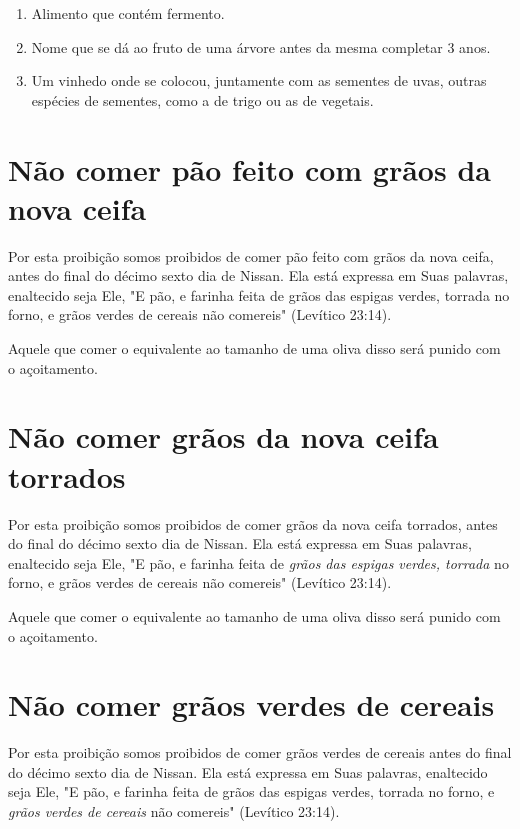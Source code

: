 \begin{enumerate}
\def\labelenumi{\arabic{enumi}.}
\setcounter{enumi}{357}
\item
 
 Alimento que contém fermento.
 
\item
 
 Nome que se dá ao fruto de uma árvore antes da mesma completar 3 anos.
 
\item
 
 Um vinhedo onde se colocou, juntamente com as sementes de uvas, outras
 espécies de se­mentes, como a de trigo ou as de vegetais.
 
\end{enumerate}

\section{Não comer pão feito com grãos da nova ceifa}

Por esta proibição somos proibidos de comer pão feito com grãos da nova
ceifa, antes do final do décimo sexto dia de Nissan. Ela está expressa
em Suas palavras, enaltecido seja Ele, "E pão, e farinha feita de grãos
das espigas verdes, torrada no forno, e grãos verdes de cereais não
comereis" (Le­vítico 23:14).

Aquele que comer o equivalente ao tamanho de uma oliva disso será punido
com o açoitamento.

\section{Não comer grãos da nova ceifa torrados}

Por esta proibição somos proibidos de comer grãos da nova ceifa
tor­rados, antes do final do décimo sexto dia de Nissan. Ela está
expressa em Suas palavras, enaltecido seja Ele, "E pão, e farinha feita
de \emph{grãos das espigas verdes, torrada} no forno, e grãos verdes de
cereais não comereis" (Levítico 23:14).

Aquele que comer o equivalente ao tamanho de uma oliva disso será punido
com o açoitamento.

\section{Não comer grãos verdes de cereais}

Por esta proibição somos proibidos de comer grãos verdes de ce­reais
antes do final do décimo sexto dia de Nissan. Ela está expressa em Suas
palavras, enaltecido seja Ele, "E pão, e farinha feita de grãos das
espigas verdes, torrada no forno, e \emph{grãos verdes de cereais} não
comereis" (Levítico 23:14).

